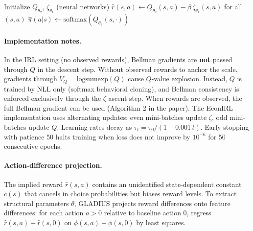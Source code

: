 \documentclass[11pt]{article}
\begin{document}
\begin{algorithm}[H]
\DontPrintSemicolon
\caption{GLADIUS: Gradient-based Learning with Ascent-Descent}
\label{alg:gladius}
\BlankLine
Initialize $Q_{\theta_2}$, $\zeta_{\theta_1}$ (neural networks)\;
\BlankLine
{}
\BlankLine
{}
$\hat{r}(s,a) \leftarrow Q_{\theta_2}(s,a) - \beta\,\zeta_{\theta_1}(s,a)$ for all $(s,a)$\;
$\hat{\pi}(a|s) \leftarrow \text{softmax}(Q_{\theta_2}(s,\cdot))$\;
\BlankLine
{}
\end{algorithm}

\paragraph{Implementation notes.} In the IRL setting (no observed rewards), Bellman gradients are \textbf{not} passed through $Q$ in the descent step. Without observed rewards to anchor the scale, gradients through $V_Q = \text{logsumexp}(Q)$ cause $Q$-value explosion. Instead, $Q$ is trained by NLL only (softmax behavioral cloning), and Bellman consistency is enforced exclusively through the $\zeta$ ascent step. When rewards are observed, the full Bellman gradient can be used (Algorithm 2 in the paper). The EconIRL implementation uses alternating updates: even mini-batches update $\zeta$, odd mini-batches update $Q$. Learning rates decay as $\tau_t = \tau_0 / (1 + 0.001\,t)$. Early stopping with patience 50 halts training when loss does not improve by $10^{-6}$ for 50 consecutive epochs.

\paragraph{Action-difference projection.} The implied reward $\hat{r}(s,a)$ contains an unidentified state-dependent constant $c(s)$ that cancels in choice probabilities but biases reward levels. To extract structural parameters $\theta$, GLADIUS projects reward differences onto feature differences: for each action $a > 0$ relative to baseline action 0, regress $\hat{r}(s,a) - \hat{r}(s,0)$ on $\phi(s,a) - \phi(s,0)$ by least squares.
\end{document}
